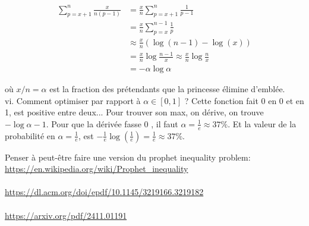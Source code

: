 \begin{solution}
    \[
        \begin{aligned}
            \sum_{p=x+1}^{n} \frac{x}{n\left(p-1\right)} & =\frac{x}{n} \sum_{p=x+1}^{n} \frac{1}{p-1} \\
            & =\frac{x}{n} \sum_{p=x}^{n-1} \frac{1}{p} \\
            & \approx \frac{x}{n}\left(\log \left(n-1\right)-\log \left(x\right)\right) \\
            & =\frac{x}{n} \log \frac{n-1}{x} \approx \frac{x}{n} \log \frac{n}{x} \\
            & =-\alpha \log \alpha
        \end{aligned}
    \]

    où \( x / n=\alpha \) est la fraction des prétendants que la princesse élimine d'emblée.\\
    vi. Comment optimiser par rapport à \( \alpha \in\left[0,1\right] \) ? Cette fonction fait 0 en 0 et en 1, est positive entre deux... Pour trouver son max, on dérive, on trouve \( -\log \alpha-1 \). Pour que la dérivée fasse 0 , il faut \( \alpha=\frac{1}{e} \approx 37 \% \). Et la valeur de la probabilité en \( \alpha=\frac{1}{e} \), est \( -\frac{1}{e} \log \left(\frac{1}{e}\right)=\frac{1}{e} \approx 37 \% \).

    Penser à peut-être faire une version du prophet inequality problem: \url{https://en.wikipedia.org/wiki/Prophet_inequality}
    \\\\
    \url{https://dl.acm.org/doi/epdf/10.1145/3219166.3219182}
    \\\\
    \url{https://arxiv.org/pdf/2411.01191}
\end{solution}
